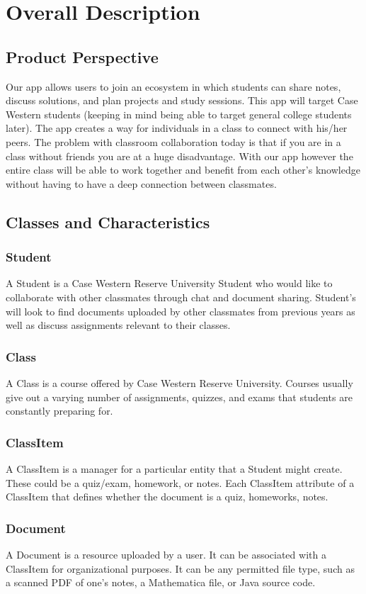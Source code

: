 \documentclass{scrreprt}
\begin{document}
\chapter{Overall Description}
\section{Product Perspective}
Our app allows users to join an ecosystem in which students can share notes, discuss solutions, and plan projects and study sessions. This app will target Case Western students (keeping in mind being able to target general college students later). The app creates a way for individuals in a class to connect with his/her peers. The problem with classroom collaboration today is that if you are in a class without friends you are at a huge disadvantage. With our app however the entire class will be able to work together and benefit from each other’s knowledge without having to have a deep connection between classmates.
\section{Classes and Characteristics}
\subsection{Student}
A Student is a Case Western Reserve University Student who would like to collaborate with other classmates through chat and document sharing. Student’s will look to find documents uploaded by other classmates from previous years as well as discuss assignments relevant to their classes.
\subsection{Class}
A Class is a course offered by Case Western Reserve University. Courses usually give out a varying number of assignments, quizzes, and exams that students are constantly preparing for.
\subsection{ClassItem}
A ClassItem is a manager for a particular entity that a Student might create. These could be a quiz/exam, homework, or notes. 
Each ClassItem attribute of a ClassItem that defines whether the document is a quiz, homeworks, notes. 
\subsection{Document}
A Document is a resource uploaded by a user. It can be associated with a ClassItem for organizational purposes. It can be any permitted file type, such as a scanned PDF of one’s notes, a Mathematica file, or Java source code. 
\end{document}
